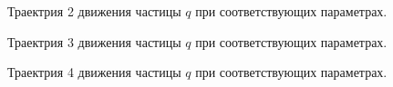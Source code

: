 \documentclass[a5paper, 10pt]{article}
\theoremstyle{definition}
\theoremstyle{plain}
\theoremstyle{remark}
\begin{document}
\begin{figure}[h!]
\caption{Траектрия 2 движения частицы $q$ при соответствующих параметрах.}
\end{figure}

\begin{figure}[h!]
\caption{Траектрия 3 движения частицы $q$ при соответствующих параметрах.}
\end{figure}

\begin{figure}[h!]
\caption{Траектрия 4 движения частицы $q$ при соответствующих параметрах.}
\end{figure}
\end{document}
